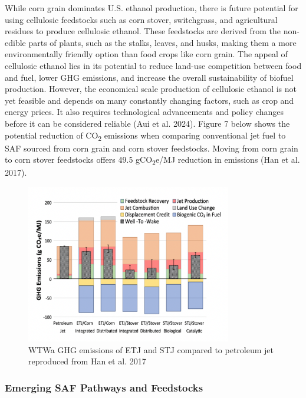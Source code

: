 \documentclass[12pt]{article}
\begin{document}
 While corn grain dominates U.S. ethanol production, there is future potential for using cellulosic feedstocks such as corn stover, switchgrass, and agricultural residues to produce cellulosic ethanol. These feedstocks are derived from the non-edible parts of plants, such as the stalks, leaves, and husks, making them a more environmentally friendly option than food crops like corn grain. The appeal of cellulosic ethanol lies in its potential to reduce land-use competition between food and fuel, lower GHG emissions, and increase the overall sustainability of biofuel production. However, the economical scale production of cellulosic ethanol is not yet feasible and depends on many constantly changing factors, such as crop and energy prices. It also requires technological advancements and policy changes before it can be considered reliable (Aui et al. 2024). Figure 7 below shows the potential reduction of CO\textsubscript{2} emissions when comparing conventional jet fuel to SAF sourced from corn grain and corn stover feedstocks. Moving from corn grain to corn stover feedstocks offers 49.5 gCO\textsubscript{2}e/MJ reduction in emissions (Han et al. 2017). 

\begin{figure}[H]
\centering
\includegraphics[width=0.8\textwidth]{Figures/Fig 7.png} %
\caption{WTWa GHG emissions of ETJ and STJ compared to petroleum jet reproduced from Han et al. 2017}
\label{fig:figure 7}
\end{figure}
 

\subsubsection{ Emerging SAF Pathways and Feedstocks}
\end{document}
